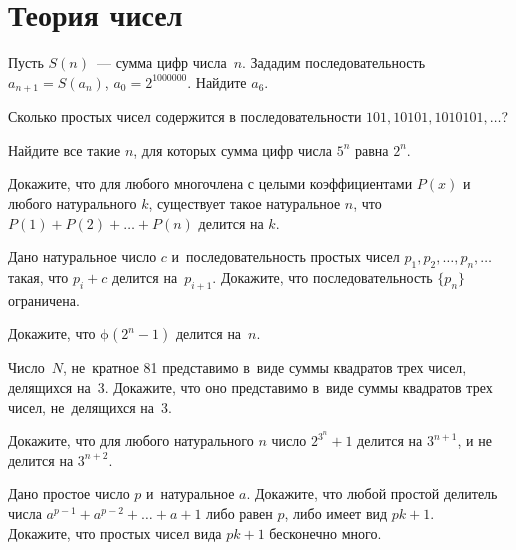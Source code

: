 
\section*{Теория чисел}


\begin{problems}

\item
Пусть $S(n)$~— сумма цифр числа~$n$.
Зададим последовательность $a_{n+1} = S(a_n)$, $a_0 = 2^{1000000}$.
Найдите $a_6$.

\item
Сколько простых чисел содержится в последовательности
$101, 10101, 1010101, \ldots$?

\item
Найдите все такие $n$, для которых сумма цифр числа $5^n$ равна $2^n$.

\item
Докажите, что для любого многочлена с целыми коэффициентами $P(x)$ и любого
натурального $k$, существует такое натуральное $n$, что
$P(1) + P(2) + \ldots + P(n)$ делится на $k$.

\item
Дано натуральное число $c$ и~последовательность простых чисел
$p_1, p_2, \ldots, p_n, \ldots$ такая, что $p_i + c$ делится на~$p_{i+1}$.
Докажите, что последовательность $\{p_n\}$ ограничена.

\item
Докажите, что $\mathrm{\phi}(2^n - 1)$ делится на~$n$.

\item
Число~$N$, не~кратное 81 представимо в~виде суммы квадратов трех чисел,
делящихся на~3.
Докажите, что оно представимо в~виде суммы квадратов трех чисел, не~делящихся
на~3.

\item
Докажите, что для любого натурального $n$ число $2^{3^n} + 1$ делится
на $3^{n+1}$, и не делится на $3^{n+2}$.

\item
\subproblem
Дано простое число $p$ и~натуральное $a$.
Докажите, что любой простой делитель числа $a^{p-1} + a^{p-2} + \ldots + a + 1$
либо равен $p$, либо имеет вид $p k + 1$.
\\
\subproblem
Докажите, что простых чисел вида $p k + 1$ бесконечно много.

\end{problems}

